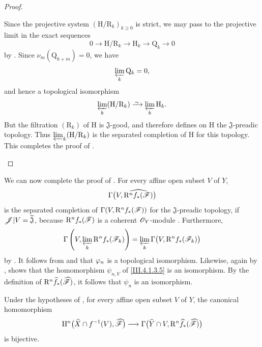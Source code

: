 \begin{proof}
\begin{env}[4.1.7.21]
Since the projective system
$(\mathrm{H}/\mathrm{R}_k)_{k\geq0}$ is strict, we may pass to the
projective limit in the exact sequences
\[
  0
  \longrightarrow
  \mathrm{H}/\mathrm{R}_k
  \longrightarrow
  \mathrm{H}_k
  \longrightarrow
  \mathrm{Q}_k
  \longrightarrow
  0
  \tag{4.1.7.22}
  \label{III.4.1.7.22}
\]
by .
Since $\nu_m(\mathrm{Q}_{k+m})=0$, we have
\[
  \varprojlim_k\mathrm{Q}_k=0,
\]
and hence a topological isomorphism
\[
  \varprojlim_k(\mathrm{H}/\mathrm{R}_k)
  \isoto
  \varprojlim_k\mathrm{H}_k.
\]
But the filtration $(\mathrm{R}_k)$ of $\mathrm{H}$ is
$\mathfrak{J}$-good, and therefore defines on $\mathrm{H}$ the
$\mathfrak{J}$-preadic topology.
Thus $\varprojlim_k(\mathrm{H}/\mathrm{R}_k)$ is the separated
completion of $\mathrm{H}$ for this topology.
This completes the proof of .
\end{env}
\end{proof}

\begin{env}[4.1.8]
\label{III.4.1.8}
We can now complete the proof of .
For every affine open subset $V$ of $Y$,
\[
  \Gamma\bigl(
    V,\widehat{\mathrm{R}^n f_*(\mathscr{F})}
  \bigr)
\]
is the separated completion of
$\Gamma(V,\mathrm{R}^n f_*(\mathscr{F}))$ for the
$\mathfrak{J}$-preadic topology, if
$\mathscr{J}|V=\widetilde{\mathfrak{J}}$, because
$\mathrm{R}^n f_*(\mathscr{F})$ is a coherent $\mathscr{O}_Y$-module
.
Furthermore,
\[
  \Gamma\left(
    V,\varprojlim_k\mathrm{R}^n f_*(\mathscr{F}_k)
  \right)
  =
  \varprojlim_k
  \Gamma\bigl(V,\mathrm{R}^n f_*(\mathscr{F}_k)\bigr)
\]
by .
It follows from  and  that
$\varphi_n$ is a topological isomorphism.
Likewise, again by ,  shows that the
homomorphism $\psi_{n,V}$ of \eqref{III.4.1.3.5} is an isomorphism.
By the definition of
$\mathrm{R}^n\widehat{f}_*(\widehat{\mathscr{F}})$, it follows that $\psi_n$ is
an isomorphism.
\end{env}

\begin{corollary}[4.1.9]
\label{III.4.1.9}
Under the hypotheses of , for every affine open
subset $V$ of $Y$, the canonical homomorphism
\[
  \mathrm{H}^n\bigl(
    \widehat{X}\cap f^{-1}(V),
    \widehat{\mathscr{F}}
  \bigr)
  \longrightarrow
  \Gamma\bigl(
    \widehat{Y}\cap V,
    \mathrm{R}^n\widehat{f}_*(\widehat{\mathscr{F}})
  \bigr)
\]
is bijective.
\end{corollary}

